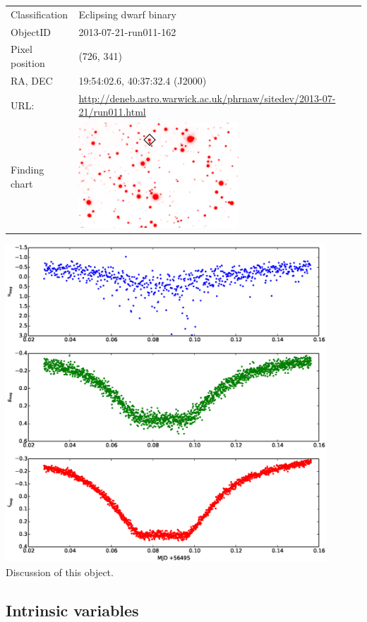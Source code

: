\begin{tabular}{l l}
  Classification & Eclipsing dwarf binary \\
  ObjectID & 2013-07-21-run011-162 \\
  Pixel position & (726, 341) \\
  RA, DEC & 19:54:02.6, 40:37:32.4 (J2000) \\
  URL: & \small \url{http://deneb.astro.warwick.ac.uk/phrnaw/sitedev/2013-07-21/run011.html} \\
  Finding chart & \includegraphics[width=60mm]{images/2013-07-21-run011-162.png} \\
  \end{tabular}
  \includegraphics[width=120mm]{images/2013-07-21-run011-162_lightcurve.eps} \\
  Discussion of this object.

\subsection{Intrinsic variables}

